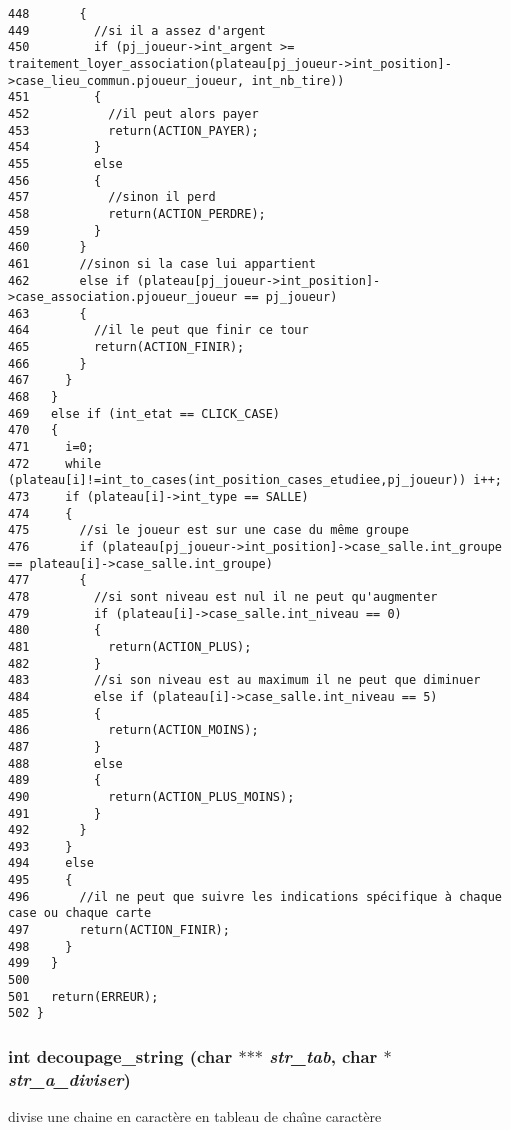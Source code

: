 \begin{Code}
\begin{verbatim}
448       {
449         //si il a assez d'argent
450         if (pj_joueur->int_argent >= traitement_loyer_association(plateau[pj_joueur->int_position]->case_lieu_commun.pjoueur_joueur, int_nb_tire))
451         {
452           //il peut alors payer
453           return(ACTION_PAYER);
454         }
455         else
456         {
457           //sinon il perd
458           return(ACTION_PERDRE);
459         }
460       }
461       //sinon si la case lui appartient
462       else if (plateau[pj_joueur->int_position]->case_association.pjoueur_joueur == pj_joueur)
463       {
464         //il le peut que finir ce tour
465         return(ACTION_FINIR);
466       }
467     }
468   }
469   else if (int_etat == CLICK_CASE)
470   {
471     i=0;
472     while (plateau[i]!=int_to_cases(int_position_cases_etudiee,pj_joueur)) i++;
473     if (plateau[i]->int_type == SALLE)
474     {
475       //si le joueur est sur une case du même groupe
476       if (plateau[pj_joueur->int_position]->case_salle.int_groupe == plateau[i]->case_salle.int_groupe)
477       {
478         //si sont niveau est nul il ne peut qu'augmenter
479         if (plateau[i]->case_salle.int_niveau == 0)
480         {
481           return(ACTION_PLUS);
482         }
483         //si son niveau est au maximum il ne peut que diminuer
484         else if (plateau[i]->case_salle.int_niveau == 5)
485         {
486           return(ACTION_MOINS);
487         }
488         else
489         {
490           return(ACTION_PLUS_MOINS);
491         }
492       }
493     }
494     else 
495     {
496       //il ne peut que suivre les indications spécifique à chaque case ou chaque carte
497       return(ACTION_FINIR);
498     }
499   }
500   
501   return(ERREUR);
502 }
\end{verbatim}\end{Code}


\subsubsection{\setlength{\rightskip}{0pt plus 5cm}int decoupage\_\-string (char $\ast$$\ast$$\ast$ {\em str\_\-tab}, char $\ast$ {\em str\_\-a\_\-diviser})}\label{outils_8h_6f12b97af4dd149267a5a423e3e5e7a7}


divise une chaine en caract\`{e}re en tableau de cha\^{\i}ne caract\`{e}re 

